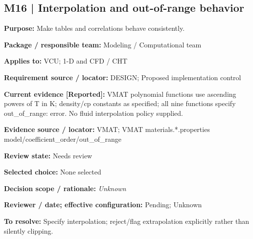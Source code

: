 \documentclass[11pt]{article}
\begin{document}
\par\noindent\begin{minipage}{\textwidth}\small\setlength{\parskip}{2pt}
\subsection*{M16 | Interpolation and out-of-range behavior}
\textbf{Purpose:} Make tables and correlations behave consistently.\par
\textbf{Package / responsible team:} Modeling / Computational team\par
\textbf{Applies to:} VCU; 1-D and CFD / CHT\par
\textbf{Requirement source / locator:} DESIGN; Proposed implementation control\par
\textbf{Current evidence [Reported]:} VMAT polynomial functions use ascending powers of T in K; density/cp constants as specified; all nine functions specify out\_\allowbreak{}of\_\allowbreak{}range: error. No fluid interpolation policy supplied.\par
\textbf{Evidence source / locator:} VMAT; VMAT materials.*.properties model/coefficient\_\allowbreak{}order/out\_\allowbreak{}of\_\allowbreak{}range\par
\textbf{Review state:} Needs review\par
\textbf{Selected choice:} None selected\par
\textbf{Decision scope / rationale:} \textit{Unknown}\par
\textbf{Reviewer / date; effective configuration:} Pending; Unknown\par
\textbf{To resolve:} Specify interpolation; reject/flag extrapolation explicitly rather than silently clipping.\par
\end{minipage}\par\vspace{5pt}
\end{document}
